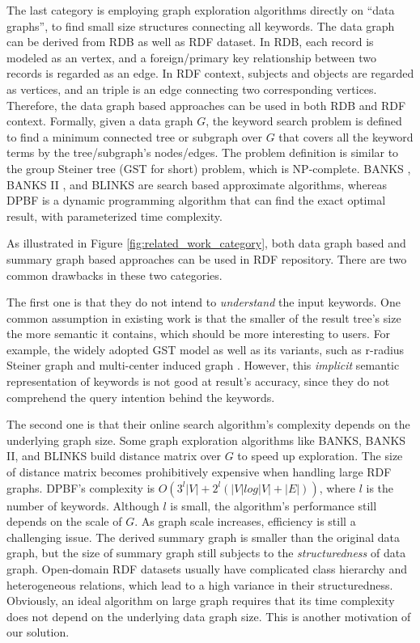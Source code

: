The last category is employing graph exploration algorithms directly on ``data graphs'', to find small size structures connecting all keywords. The data graph can be derived from RDB as well as RDF dataset. In RDB, each record is modeled as an vertex, and a foreign/primary key relationship between two records is regarded as an edge. In RDF context, subjects and objects are regarded as vertices, and an triple is an edge connecting two corresponding vertices. Therefore, the data graph based approaches can be used in both RDB and RDF context. Formally, given a data graph $G$, the keyword search problem is defined to find a minimum connected tree \cite{ding2007finding} or subgraph \cite{elbassuoni2011keyword} over $G$ that covers all the keyword terms by the tree/subgraph's nodes/edges. The problem definition is similar to the group Steiner tree (GST for short) problem, which is NP-complete. BANKS \cite{bhalotia2002keyword}, BANKS II \cite{kacholia2005bidirectional}, and BLINKS \cite{he2007blinks} are search based approximate algorithms, whereas DPBF \cite{ding2007finding} is a dynamic programming algorithm that can find the exact optimal result, with parameterized time complexity.

As illustrated in Figure \ref{fig:related_work_category}, both data graph based and summary graph based approaches can be used in RDF repository. There are two common drawbacks in these two categories. 

The first one is that they do not intend to \emph{understand} the input keywords. One common assumption in existing work is that the smaller of the result tree's size the more semantic it contains, which should be more interesting to users. For example, the widely adopted GST model as well as its variants, such as r-radius Steiner graph \cite{li2008ease} and multi-center induced graph \cite{qin2009querying}. However, this \emph{implicit} semantic representation of keywords is not good at result's accuracy, since they do not comprehend the query intention behind the keywords.

The second one is that their online search algorithm's complexity depends on the underlying graph size. Some graph exploration algorithms like BANKS, BANKS II, and BLINKS build distance matrix over $G$ to speed up exploration. The size of distance matrix becomes prohibitively expensive when handling large RDF graphs. DPBF's complexity is $O(3^l|V|+2^l(|V|log|V|+|E|))$, where $l$ is the number of keywords. Although $l$ is small, the algorithm's performance still depends on the scale of $G$. As graph scale increases, efficiency is still a challenging issue. The derived summary graph is smaller than the original data graph, but the size of summary graph still subjects to the \emph{structuredness} of data graph. Open-domain RDF datasets usually have complicated class hierarchy and heterogeneous relations, which lead to a high variance in their structuredness. Obviously, an ideal algorithm on large graph requires that its time complexity does not depend on the underlying data graph size. This is another motivation of our solution. 

